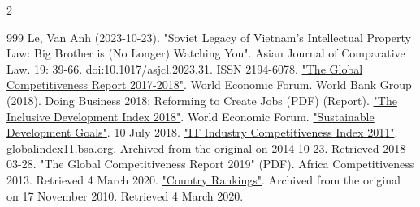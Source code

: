 \documentclass[openany]{book}
\begin{document}
\begin{multicols}{2}
\begin{thebibliography}{999}
 Le, Van Anh (2023-10-23). "Soviet Legacy of Vietnam's Intellectual Property Law: Big Brother is (No Longer) Watching You". Asian Journal of Comparative Law. 19: 39-66. doi:10.1017/asjcl.2023.31. ISSN 2194-6078.
 \href{https://www.weforum.org/reports/the-global-competitiveness-report-2017-2018/}{"The Global Competitiveness Report 2017-2018"}. World Economic Forum.
 World Bank Group (2018). Doing Business 2018: Reforming to Create Jobs (PDF) (Report).
 \href{https://www.weforum.org/reports/the-inclusive-development-index-2018/}{"The Inclusive Development Index 2018"}. World Economic Forum.
 \href{https://vietnam.opendevelopmentmekong.net/topics/sustainable-development-goals/}{"Sustainable Development Goals"}. 10 July 2018.
 \href{https://web.archive.org/web/20141023075154/http://globalindex11.bsa.org/}{"IT Industry Competitiveness Index 2011"}. globalindex11.bsa.org. Archived from the original on 2014-10-23. Retrieved 2018-03-28.
 "The Global Competitiveness Report 2019" (PDF). Africa Competitiveness 2013. Retrieved 4 March 2020.
 \href{https://web.archive.org/web/20101117114939/http://www.heritage.org/Index/ranking}{"Country Rankings"}. Archived from the original on 17 November 2010. Retrieved 4 March 2020.

\end{thebibliography}
\end{multicols}
\endgroup
\end{document}
